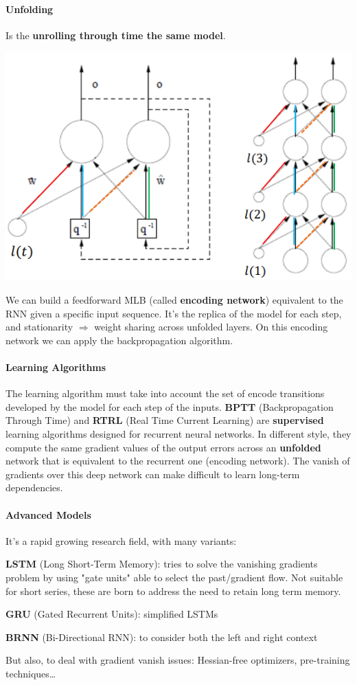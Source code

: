 \documentclass[10pt]{report}
\begin{document}
\paragraph{Unfolding} Is the \textbf{unrolling through time the same model}.
\begin{center}
	\includegraphics[scale=0.5]{38.png}
\end{center}
We can build a feedforward MLB (called \textbf{encoding network}) equivalent to the RNN given a specific input sequence. It's the replica of the model for each step, and stationarity $\Rightarrow$ weight sharing across unfolded layers. On this encoding network we can apply the backpropagation algorithm.
\paragraph{Learning Algorithms} The learning algorithm must take into account the set of encode transitions developed by the model for each step of the inputs. \textbf{BPTT} (Backpropagation Through Time) and \textbf{RTRL} (Real Time Current Learning) are \textbf{supervised} learning algorithms designed for recurrent neural networks. In different style, they compute the same gradient values of the output errors across an \textbf{unfolded} network that is equivalent to the recurrent one (encoding network). The vanish of gradients over this deep network can make difficult to learn long-term dependencies.
\paragraph{Advanced Models} It's a rapid growing research field, with many variants:
\begin{list}{}{}
	\item \textbf{LSTM} (Long Short-Term Memory): tries to solve the vanishing gradients problem by using "gate units" able to select the past/gradient flow. Not suitable for short series, these are born to address the need to retain long term memory.
	\item \textbf{GRU} (Gated Recurrent Units): simplified LSTMs
	\item \textbf{BRNN} (Bi-Directional RNN): to consider both the left and right context
	\item But also, to deal with gradient vanish issues: Hessian-free optimizers, pre-training techniques\ldots
\end{list}
\end{document}
